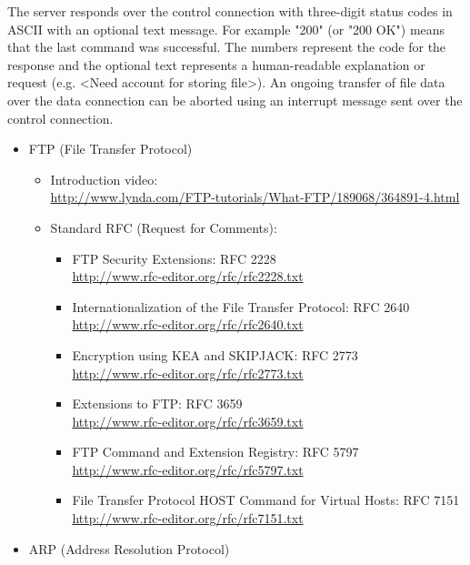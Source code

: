 The server responds over the control connection with three-digit
status codes in ASCII with an optional text message. For example "200"
(or "200 OK") means that the last command was successful. The numbers
represent the code for the response and the optional text represents a
human-readable explanation or request (e.g. <Need account for storing
file>).\cite{10} An ongoing transfer of file data over the data connection
can be aborted using an interrupt message sent over the control
connection.

\begin{itemize}
\item FTP (File Transfer Protocol)\\
\begin{itemize}
\item Introduction video:\\
\url{http://www.lynda.com/FTP-tutorials/What-FTP/189068/364891-4.html}
\item Standard RFC (Request for Comments): 
\begin{itemize}
\item FTP Security Extensions: RFC 2228\\
\url{http://www.rfc-editor.org/rfc/rfc2228.txt}\\
\item Internationalization of the File Transfer Protocol: RFC 2640\\
\url{http://www.rfc-editor.org/rfc/rfc2640.txt}\\
\item Encryption using KEA and SKIPJACK: RFC 2773\\
\url{http://www.rfc-editor.org/rfc/rfc2773.txt}\\
\item Extensions to FTP: RFC 3659\\
\url{http://www.rfc-editor.org/rfc/rfc3659.txt}\\
\item FTP Command and Extension Registry: RFC 5797\\
\url{http://www.rfc-editor.org/rfc/rfc5797.txt}\\
\item File Transfer Protocol HOST Command for Virtual Hosts: RFC 7151\\
\url{http://www.rfc-editor.org/rfc/rfc7151.txt}\\
\end{itemize}
\end{itemize}
\item ARP (Address Resolution Protocol)\\

\end{itemize}
